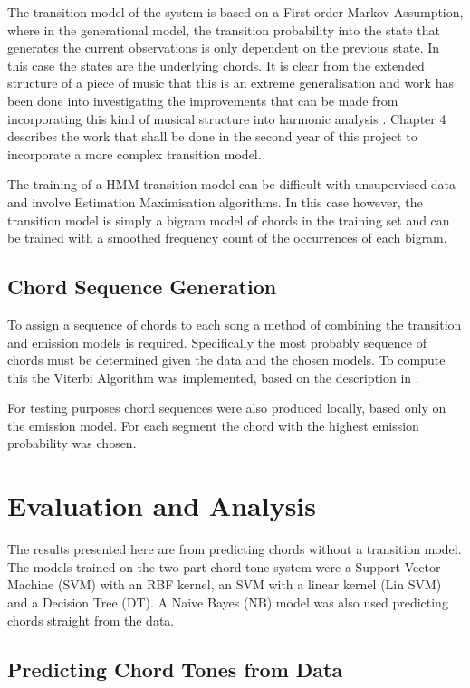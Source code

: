 \documentclass[bsc,singlespacing,parskip,deptreport]{infthesis}
\begin{document}
The transition model of the system is based on a First order Markov Assumption, where in the generational model, the transition probability into the state that generates the current observations is only dependent on the previous state. In this case the states are the underlying chords. It is clear from the extended structure of a piece of music that this is an extreme generalisation and work has been done into investigating the improvements that can be made from incorporating this kind of musical structure into harmonic analysis \cite{struct}. Chapter 4 describes the work that shall be done in the second year of this project to incorporate a more complex transition model.

The training of a HMM transition model can be difficult with unsupervised data and involve Estimation Maximisation algorithms. In this case however, the transition model is simply a bigram model of chords in the training set and can be trained with a smoothed frequency count of the occurrences of each bigram.

\section{Chord Sequence Generation}

To assign a sequence of chords to each song a method of combining the transition and emission models is required. Specifically the most probably sequence of chords must be determined given the data and the chosen models. To compute this the Viterbi Algorithm was implemented, based on the description in \cite{jur}.

For testing purposes chord sequences were also produced locally, based only on the emission model. For each segment the chord with the highest emission probability was chosen.

\chapter{Evaluation and Analysis}

The results presented here are from predicting chords without a transition model. The models trained on the two-part chord tone system were a Support Vector Machine (SVM) with an RBF kernel, an SVM with a linear kernel (Lin SVM) and a Decision Tree (DT). A Naive Bayes (NB) model was also used predicting chords straight from the data.

\section{Predicting Chord Tones from Data}
\end{document}
